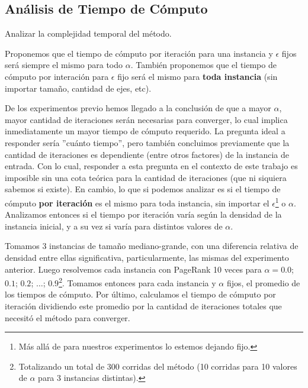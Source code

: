 \subsection{An\'alisis de Tiempo de C\'omputo}
\label{subsec:exp4}
\begin{LaTeXdescription}
    \item[Objetivo] Analizar la complejidad temporal del m\'etodo.

    \item[Hip\'otesis] Proponemos que el tiempo de c\'omputo por iteraci\'on
        para una instancia y $\epsilon$ fijos ser\'a siempre el mismo para todo
        $\alpha$. Tambi\'en proponemos que el tiempo de c\'omputo por interación
        para $\epsilon$ fijo ser\'a el mismo para \textbf{toda instancia} (sin
        importar tama\~no, cantidad de ejes, etc).\\

    \item[Proposici\'on] De los experimentos previo hemos llegado a la
        conclusi\'on de que a mayor $\alpha$, mayor cantidad de iteraciones
        ser\'an necesarias para converger, lo cual implica inmediatamente un mayor tiempo
        de c\'omputo requerido. La pregunta ideal a responder ser\'ia ''cu\'anto
        tiempo'', pero
        tambi\'en concluimos previamente que la cantidad de iteraciones es
        dependiente (entre otros factores) de la instancia de entrada. Con lo
        cual, responder a esta pregunta en el contexto de este trabajo es
        imposible sin una cota te\'orica para la cantidad de
        iteraciones (que ni siquiera sabemos si existe). En cambio, lo que si podemos analizar es
        si el tiempo de c\'omputo \textbf{por iteraci\'on} es el mismo para toda
        instancia, sin importar el $\epsilon$\footnote{M\'as all\'a de para nuestros
        experimentos lo estemos dejando fijo.} o $\alpha$. Analizamos entonces
        si el tiempo por iteraci\'on var\'ia seg\'un
        la densidad de la instancia inicial, y a su vez si varía para distintos
        valores de $\alpha$.\\

    \item[M\'etodo de Experimentaci\'on] Tomamos 3 instancias de tama\~no
        mediano-grande, con una diferencia relativa de densidad entre ellas
        significativa, particularmente, las mismas del experimento anterior.
        Luego resolvemos cada instancia con PageRank 10 veces para $\alpha=0.0$;
        $0.1$; $0.2$; $\dots$; $0.9$\footnote{Totalizando un total de 300
        corridas del m\'etodo (10 corridas para 10 valores de $\alpha$ para 3
        instancias distintas).}.  Tomamos entonces para cada instancia y
        $\alpha$ fijos, el promedio de los tiempos de c\'omputo. Por \'ultimo,
        calculamos el tiempo de c\'omputo por iteraci\'on dividiendo este
        promedio por la cantidad de iteraciones totales que necesit\'o el
        m\'etodo para converger.\\


\end{LaTeXdescription}
